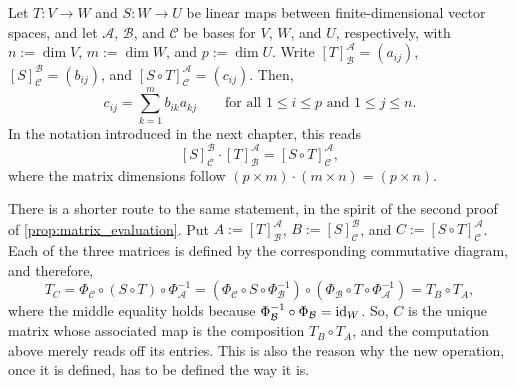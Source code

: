 \begin{proposition*}
\label{prop:representation_matrix_of_composition}
Let $T: V \to W$ and $S: W \to U$ be linear maps between finite-di\-men\-sional vector spaces, and let $\mathcal{A}$, $\mathcal{B}$, and $\mathcal{C}$ be bases for $V$, $W$, and $U$, respectively, with $n := \dim V$, $m := \dim W$, and $p := \dim U$. Write $[T]_{\mathcal{B}}^{\mathcal{A}} = (a_{ij})$, $[S]_{\mathcal{C}}^{\mathcal{B}} = (b_{ij})$, and $[S \circ T]_{\mathcal{C}}^{\mathcal{A}} = (c_{ij})$. Then,
\[
c_{ij} = \sum_{k=1}^m b_{ik} a_{kj} \qquad \text{for all } 1 \le i \le p \text{ and } 1 \le j \le n.
\]
In the notation introduced in the next chapter, this reads
\[
[S]_{\mathcal{C}}^{\mathcal{B}} \cdot [T]_{\mathcal{B}}^{\mathcal{A}} = [S \circ T]_{\mathcal{C}}^{\mathcal{A}},
\]
where the matrix dimensions follow $(p \times m) \cdot (m \times n) = (p \times n)$.
\end{proposition*}

\begin{remark}
There is a shorter route to the same statement, in the spirit of the second proof of \cref{prop:matrix_evaluation}. Put $A := [T]_{\mathcal{B}}^{\mathcal{A}}$, $B := [S]_{\mathcal{C}}^{\mathcal{B}}$, and $C := [S \circ T]_{\mathcal{C}}^{\mathcal{A}}$. Each of the three matrices is defined by the corresponding commutative diagram, and therefore,
\[
T_C = \Phi_{\mathcal{C}} \circ (S \circ T) \circ \Phi_{\mathcal{A}}^{-1} = \left( \Phi_{\mathcal{C}} \circ S \circ \Phi_{\mathcal{B}}^{-1} \right) \circ \left( \Phi_{\mathcal{B}} \circ T \circ \Phi_{\mathcal{A}}^{-1} \right) = T_B \circ T_A,
\]
where the middle equality holds because $\Phi_{\mathcal{B}}^{-1} \circ \Phi_{\mathcal{B}} = \operatorname{id}_W$. So, $C$ is the unique matrix whose associated map is the composition $T_B \circ T_A$, and the computation above merely reads off its entries. This is also the reason why the new operation, once it is defined, has to be defined the way it is.
\end{remark}


